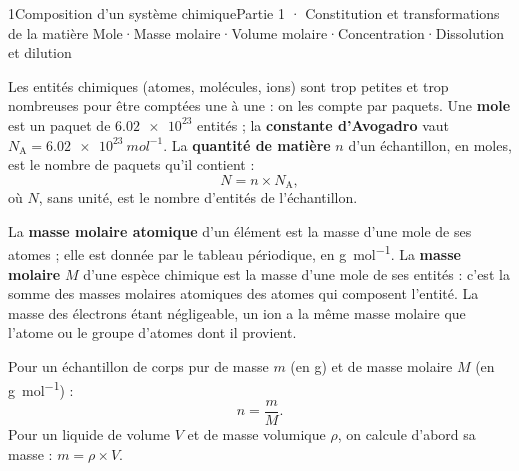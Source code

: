 \begin{ouverture}[mole]{1}{Composition d'un système chimique}{Partie 1 · Constitution et transformations de la matière}
{Mole\enspace·\enspace Masse molaire\enspace·\enspace Volume molaire\enspace·\enspace Concentration\enspace·\enspace Dissolution et dilution}
\end{ouverture}
\essentiel
{}
\begin{definition}[La mole]
Les entités chimiques (atomes, molécules, ions) sont trop petites et trop nombreuses pour être comptées une à une : on
les compte par paquets. Une \textbf{mole} est un paquet de $\num{6.02e23}$ entités ; la \textbf{constante d'Avogadro} vaut
$N_\mathrm{A}=\qty{6,02e23}{mol^{-1}}$. La \textbf{quantité de matière} $n$ d'un échantillon, en moles, est le nombre de paquets qu'il contient :
\[N=n\times N_\mathrm{A},\]
où $N$, sans unité, est le nombre d'entités de l'échantillon.
\end{definition}
\begin{definition}
La \textbf{masse molaire atomique} d'un élément est la masse d'une mole de ses atomes ; elle est donnée par le tableau
périodique, en \unit{g.mol^{-1}}. La \textbf{masse molaire} $M$ d'une espèce chimique est la masse d'une mole de ses entités : c'est la
somme des masses molaires atomiques des atomes qui composent l'entité. La masse des électrons étant négligeable, un ion a
la même masse molaire que l'atome ou le groupe d'atomes dont il provient.
\end{definition}
\begin{propriete}
Pour un échantillon de corps pur de masse $m$ (en g) et de masse molaire $M$ (en \unit{g.mol^{-1}}) :
\[n=\frac{m}{M}.\]
Pour un liquide de volume $V$ et de masse volumique $\rho$, on calcule d'abord sa masse : $m=\rho\times V$.
\end{propriete}
